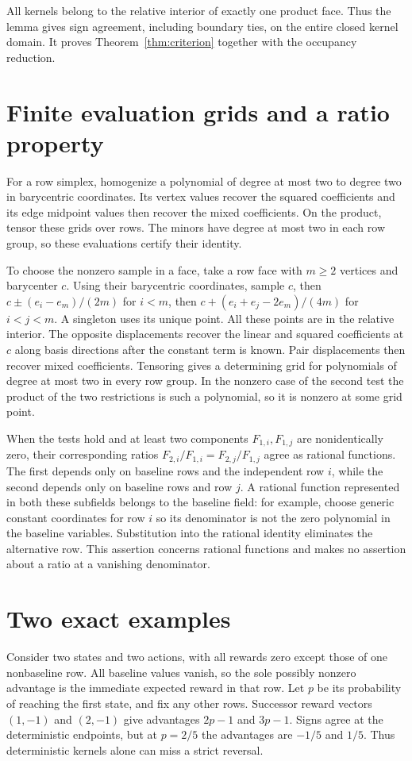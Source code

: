 \documentclass[11pt,a4paper]{amsart}
\begin{document}
All kernels belong to the relative interior of exactly one product face. Thus the lemma gives sign agreement, including boundary ties, on the entire closed kernel domain. It proves Theorem~\ref{thm:criterion} together with the occupancy reduction.

\section{Finite evaluation grids and a ratio property}
For a row simplex, homogenize a polynomial of degree at most two to degree two in barycentric coordinates. Its vertex values recover the squared coefficients and its edge midpoint values then recover the mixed coefficients. On the product, tensor these grids over rows. The minors have degree at most two in each row group, so these evaluations certify their identity.

To choose the nonzero sample in a face, take a row face with $m\geq2$ vertices and barycenter $c$. Using their barycentric coordinates, sample $c$, then $c\pm(e_i-e_m)/(2m)$ for $i<m$, then $c+(e_i+e_j-2e_m)/(4m)$ for $i<j<m$. A singleton uses its unique point. All these points are in the relative interior. The opposite displacements recover the linear and squared coefficients at $c$ along basis directions after the constant term is known. Pair displacements then recover mixed coefficients. Tensoring gives a determining grid for polynomials of degree at most two in every row group. In the nonzero case of the second test the product of the two restrictions is such a polynomial, so it is nonzero at some grid point.

When the tests hold and at least two components $F_{1,i},F_{1,j}$ are nonidentically zero, their corresponding ratios $F_{2,i}/F_{1,i}=F_{2,j}/F_{1,j}$ agree as rational functions. The first depends only on baseline rows and the independent row $i$, while the second depends only on baseline rows and row $j$. A rational function represented in both these subfields belongs to the baseline field: for example, choose generic constant coordinates for row $i$ so its denominator is not the zero polynomial in the baseline variables. Substitution into the rational identity eliminates the alternative row. This assertion concerns rational functions and makes no assertion about a ratio at a vanishing denominator.

\section{Two exact examples}
Consider two states and two actions, with all rewards zero except those of one nonbaseline row. All baseline values vanish, so the sole possibly nonzero advantage is the immediate expected reward in that row. Let $p$ be its probability of reaching the first state, and fix any other rows. Successor reward vectors $(1,-1)$ and $(2,-1)$ give advantages $2p-1$ and $3p-1$. Signs agree at the deterministic endpoints, but at $p=2/5$ the advantages are $-1/5$ and $1/5$. Thus deterministic kernels alone can miss a strict reversal.
\end{document}
